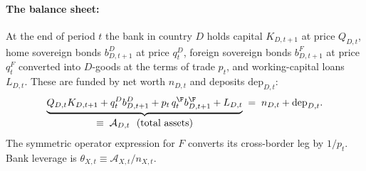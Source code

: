 \paragraph{The balance sheet:} At the end of period $t$ the bank in country $D$ holds capital $K_{D,t+1}$ at price $Q_{D,t}$, home sovereign bonds $b^{D}_{D,t+1}$ at price $q^{D}_t$, foreign sovereign bonds $b^{F}_{D,t+1}$ at price $q^{F}_t$ converted into $D$-goods at the terms of trade $p_t$, and working-capital loans $L_{D,t}$. These
are funded by net worth $n_{D,t}$ and deposits $\mathrm{dep}_{D,t}$:
\begin{equation}
\underbrace{Q_{D,t}K_{D,t+1}
   +q^{D}_{t}b^{D}_{D,t+1}
   +p_t\,q^{\F}_{t}b^{\F}_{D,t+1}
   +L_{D,t}}_{\textstyle \equiv\;\mathcal{A}_{D,t}\ \ (\text{total assets})}
\;=\;n_{D,t}+\mathrm{dep}_{D,t}.
\label{eq:balance-sheet}
\end{equation}
The symmetric operator expression for $F$ converts its cross-border leg by $1/p_t$. Bank
leverage is $\theta_{X,t}\equiv\mathcal{A}_{X,t}/n_{X,t}$.

